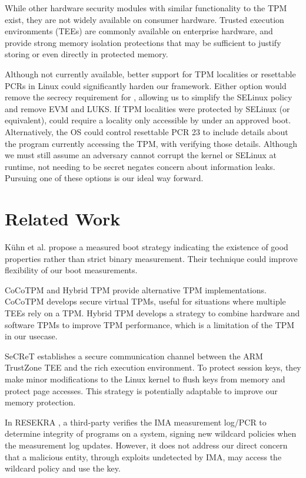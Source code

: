 \documentclass[12pt,letterpaper]{kuthesis}
\begin{document}
While other hardware security modules with similar functionality to the TPM exist, they are not widely available on consumer hardware.
Trusted execution environments (TEEs) are commonly available on enterprise hardware,
and provide strong memory isolation protections that
may be sufficient to justify storing \wcp or even \pk directly in protected memory.

Although not currently available,
better support for TPM localities or resettable PCRs in Linux could significantly harden our framework.
Either option would remove the secrecy requirement for \wcp,
allowing us to simplify the SELinux policy and remove EVM and LUKS.
If TPM localities were protected by SELinux (or equivalent),
\wcp could require a locality only accessible by \tpmsign under an approved boot.
Alternatively, the OS could control resettable PCR 23 to include details about the program currently accessing the TPM,
with \wcp verifying those details.
Although we must still assume an adversary cannot corrupt the kernel or SELinux at runtime,
\wcp not needing to be secret negates concern about information leaks.
Pursuing one of these options is our ideal way forward.

\section{Related Work}
K\"uhn et al. \cite{Kuhn:Realizing-Property-Based-Attestation:2007} propose a measured boot strategy indicating the existence of good properties rather than strict binary measurement.
Their technique could improve flexibility of our boot measurements.

CoCoTPM \cite{Pecholt:CoCoTPM-Secure-vTPM:2022} and Hybrid TPM \cite{Kim:hTPM-Hybrid-TPM:2019} provide alternative TPM implementations.
CoCoTPM develops secure virtual TPMs, useful for situations where multiple TEEs rely on a TPM.
Hybrid TPM develops a strategy to combine hardware and software TPMs to improve TPM performance, which is a limitation of the TPM in our usecase.

SeCReT \cite{Jang:SeCReT:2015} establishes a secure communication channel between the ARM TrustZone TEE and the rich execution environment.
To protect session keys, they make minor modifications to the Linux kernel to flush keys from memory and protect page accesses.
This strategy is potentially adaptable to improve our memory protection.

In RESEKRA \cite{Gomez:RESEKRA:2022},
a third-party verifies the IMA measurement log/PCR to determine integrity of programs on a system,
signing new wildcard policies when the measurement log updates.
However, it does not address our direct concern that a malicious entity,
through exploits undetected by IMA, may access the wildcard policy and use the key.
\end{document}
